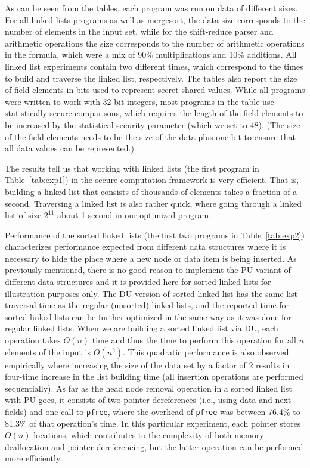 \documentclass[11pt]{article}
\begin{document}
As can be seen from the tables, each program was run on data of different 
sizes. For all linked lists programs as well as mergesort, the data size
corresponds to the number of elements in the input set, while for the
shift-reduce parser and arithmetic operations the size corresponds to the
number of arithmetic operations in the formula, which were a mix of 90\%
multiplications and 10\% additions. All linked list experiments contain two
different times, which correspond to the times to build and traverse the
linked list, respectively. The tables also report the size of field elements
in bits used to represent secret shared values. While all programs were
written to work with 32-bit integers, most programs in the table use
statistically secure comparisons, which requires the length of the field
elements to be increased by the statistical security parameter (which we set
to 48). (The size of the field elements needs to be the size
of the data plus one bit to ensure that all data values can be represented.)

The results tell us that working with linked lists (the first program in
Table~\ref{tab:exp1}) in the secure computation framework is very efficient.
That is, building a linked list that consists of thousands of elements takes
a fraction of a second. Traversing a linked list is also rather quick, where
going through a linked list of size $2^{11}$ about 1 second in our optimized
program. 

Performance of the sorted linked lists (the first two programs in
Table~\ref{tab:exp2}) characterizes performance expected from different data
structures where it is necessary to hide the place where a new node or data
item is being inserted. As previously mentioned, there is no good reason to
implement the PU variant of different data structures and it is provided
here for sorted linked lists for illustration purposes only. The DU version
of sorted linked list has the same list traversal time as the regular
(unsorted) linked lists, and the reported time for sorted linked lists can
be further optimized in the same way as it was done for regular linked
lists. When we are building a sorted linked list via DU, each operation
takes $O(n)$ time and thus the time to perform this operation for all $n$
elements of the input is $O(n^2)$. This quadratic performance is also
observed empirically where increasing the size of the data set by a factor
of 2 results in four-time increase in the list building time (all insertion
operations are performed sequentially).  As far as the head node removal
operation in a sorted linked list with PU goes, it consists of two pointer
dereferences (i.e., using data and next fields) and one call to
\texttt{pfree}, where the overhead of \texttt{pfree} was between 76.4\% to
81.3\% of that operation's time. In this particular experiment, each pointer
stores $O(n)$ locations, which contributes to the complexity of both memory
deallocation and pointer dereferencing, but the latter operation can be
performed more efficiently.
\end{document}
